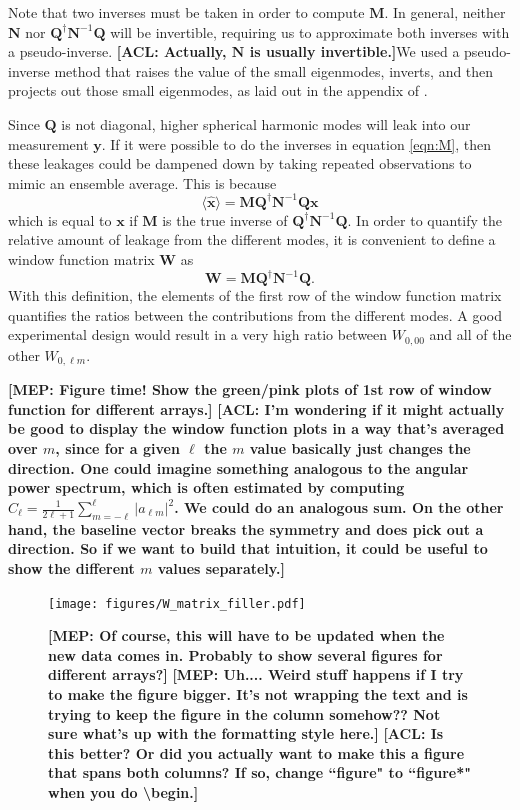 \documentclass[twolcolumn,apj]{emulateapj}
\newcommand{\x}{\mathbf{x}}
\newcommand{\xhat}{\hat{\mathbf{x}}}
\newcommand{\y}{\mathbf{y}}
\newcommand{\N}{\mathbf{N}}
\newcommand{\Q}{\mathbf{Q}}
\newcommand{\M}{\mathbf{M}}
\newcommand{\W}{\mathbf{W}}
\newcommand{\acl}[1]{{\color{red} \textbf{[ACL:  #1]}}}
\newcommand{\mep}[1]{{\color{applegreen} \textbf{[MEP:  #1]}}}
\begin{document}
Note that two inverses must be taken in order to compute $\M$. In general, neither $\N$ nor $\Q^\dagger \N^{-1} \Q$ will be invertible, requiring us to approximate both inverses with a pseudo-inverse. \acl{Actually, $\mathbf{N}$ is usually invertible.}We used a pseudo-inverse method that raises the value of the small eigenmodes, inverts, and then projects out those small eigenmodes, as laid out in the appendix of \citet{Tegmark_CMB_spectra_wli}. 

Since $\Q$ is not diagonal, higher spherical harmonic modes will leak into our measurement $\y$. If it were possible to do the inverses in equation \ref{eqn:M}, then these leakages could be dampened down by taking repeated observations to mimic an ensemble average. This is because 
\begin{equation}
\langle \xhat \rangle = \M \Q^\dagger \N^{-1} \Q \x
\end{equation}
which is equal to $\x$ if $\M$ is the true inverse of $\Q^\dagger \N^{-1} \Q$. In order to quantify the relative amount of leakage from the different modes, it is convenient to define a window function matrix $\W$ as 
\begin{equation}
\W = \M \Q^\dagger \N^{-1} \Q. 
\end{equation}
With this definition, the elements of the first row of the window function matrix quantifies the ratios between the contributions from the different modes. A good experimental design would result in a very high ratio between $W_{0,00}$ and all of the other $W_{0,\ell m}$.

\mep{Figure time! Show the green/pink plots of 1st row of window function for different arrays.}
\acl{I'm wondering if it might actually be good to display the window function plots in a way that's averaged over $m$, since for a given $\ell$ the $m$ value basically just changes the direction.  One could imagine something analogous to the angular power spectrum, which is often estimated by computing $\hat{C}_\ell = \frac{1}{2\ell + 1} \sum_{m=-\ell}^{\ell} |a_{\ell m}|^2$.  We could do an analogous sum.  On the other hand, the baseline vector breaks the symmetry and does pick out a direction.  So if we want to build that intuition, it could be useful to show the different $m$ values separately.}

\begin{figure}[h]
	\centering
	\texttt{[image: figures/W\_matrix\_filler.pdf]}
	\caption{\mep{Of course, this will have to be updated when the new data comes in. Probably to show several figures for different arrays?}\mep{Uh.... Weird stuff happens if I try to make the figure bigger. It's not wrapping the text and is trying to keep the figure in the column somehow?? Not sure what's up with the formatting style here.}\acl{Is this better? Or did you actually want to make this a figure that spans both columns? If so, change ``figure" to ``figure*" when you do \textbackslash begin.}}
	\label{fig:WindowFunction}
\end{figure}
\end{document}
